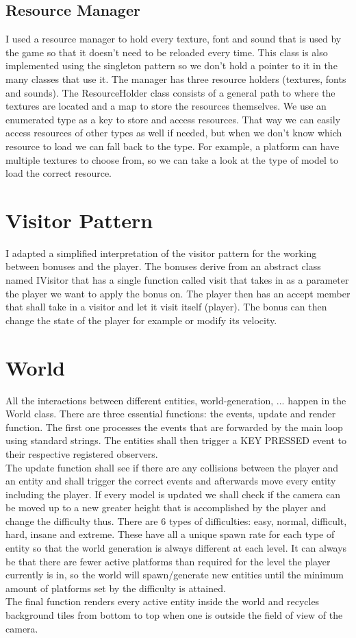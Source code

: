 \documentclass{report}
\begin{document}
\subsection{Resource Manager}
I used a resource manager to hold every texture, font and sound that is used by the game so that it doesn't need to be reloaded every time. This class is also implemented using the singleton pattern so we don't hold a pointer to it in the many classes that use it. The manager has three resource holders (textures, fonts and sounds). The ResourceHolder class consists of a general path to where the textures are located and a map to store the resources themselves. We use an enumerated type as a key to store and access resources. That way we can easily access resources of other types as well if needed, but when we don't know which resource to load we can fall back to the type. For example, a platform can have multiple textures to choose from, so we can take a look at the type of model to load the correct resource.

\section{Visitor Pattern}
I adapted a simplified interpretation of the visitor pattern for the working between bonuses and the player. The bonuses derive from an abstract class named IVisitor that has a single function called visit that takes in as a parameter the player we want to apply the bonus on. The player then has an accept member that shall take in a visitor and let it visit itself (player). The bonus can then change the state of the player for example or modify its velocity.

\section{World}
All the interactions between different entities, world-generation, ... happen in the World class. There are three essential functions: the events, update and render function.
The first one processes the events that are forwarded by the main loop using standard strings. The entities shall then trigger a KEY PRESSED event to their respective registered observers. \\
The update function shall see if there are any collisions between the player and an entity and shall trigger the correct events and afterwards move every entity including the player. If every model is updated we shall check if the camera can be moved up to a new greater height that is accomplished by the player and change the difficulty thus. There are 6 types of difficulties: easy, normal, difficult, hard, insane and extreme. These have all a unique spawn rate for each type of entity so that the world generation is always different at each level. It can always be that there are fewer active platforms than required for the level the player currently is in, so the world will spawn/generate new entities until the minimum amount of platforms set by the difficulty is attained. \\
The final function renders every active entity inside the world and recycles background tiles from bottom to top when one is outside the field of view of the camera.
\end{document}
